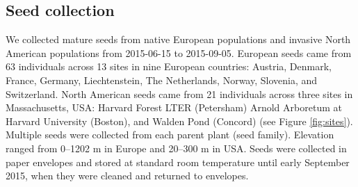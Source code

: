 \documentclass[12pt]{article}\usepackage[]{graphicx}\usepackage[]{color}
\begin{document}
	\subsection{Seed collection} 
	We collected mature seeds from native European populations and invasive North American populations from 2015-06-15 to 2015-09-05. European seeds came from 63 individuals across 13 sites in nine European countries: Austria, Denmark, France, Germany, Liechtenstein, The Netherlands, Norway, Slovenia, and Switzerland.  North American seeds came from 21 individuals across three sites  in Massachusetts, USA: Harvard Forest LTER (Petersham) Arnold Arboretum at Harvard University (Boston), and Walden Pond (Concord) (see Figure \ref{fig:sites}). Multiple seeds were collected from each parent plant (seed family). Elevation ranged from 0--1202 m in Europe and 20--300 m in USA. Seeds were collected in paper envelopes and stored at standard room temperature until early September 2015, when they were cleaned and returned to envelopes.  %
	
	
\end{document}
